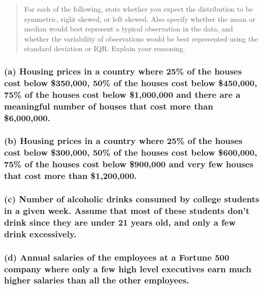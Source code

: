 \documentclass[
]{article}
\begin{document}
\begin{quote}
For each of the following, state whether you expect the distribution to
be symmetric, right skewed, or left skewed. Also specify whether the
mean or median would best represent a typical observation in the data,
and whether the variability of observations would be best represented
using the standard deviation or IQR. Explain your reasoning.
\end{quote}

\subsubsection{(a) Housing prices in a country where 25\% of the houses
cost below \$350,000, 50\% of the houses cost below \$450,000, 75\% of
the houses cost below \$1,000,000 and there are a meaningful number of
houses that cost more than
\$6,000,000.}\label{a-housing-prices-in-a-country-where-25-of-the-houses-cost-below-350000-50-of-the-houses-cost-below-450000-75-of-the-houses-cost-below-1000000-and-there-are-a-meaningful-number-of-houses-that-cost-more-than-6000000.}

\subsubsection{(b) Housing prices in a country where 25\% of the houses
cost below \$300,000, 50\% of the houses cost below \$600,000, 75\% of
the houses cost below \$900,000 and very few houses that cost more than
\$1,200,000.}\label{b-housing-prices-in-a-country-where-25-of-the-houses-cost-below-300000-50-of-the-houses-cost-below-600000-75-of-the-houses-cost-below-900000-and-very-few-houses-that-cost-more-than-1200000.}

\subsubsection{(c) Number of alcoholic drinks consumed by college
students in a given week. Assume that most of these students don't drink
since they are under 21 years old, and only a few drink
excessively.}\label{c-number-of-alcoholic-drinks-consumed-by-college-students-in-a-given-week.-assume-that-most-of-these-students-dont-drink-since-they-are-under-21-years-old-and-only-a-few-drink-excessively.}

\subsubsection{(d) Annual salaries of the employees at a Fortune 500
company where only a few high level executives earn much higher salaries
than all the other
employees.}\label{d-annual-salaries-of-the-employees-at-a-fortune-500-company-where-only-a-few-high-level-executives-earn-much-higher-salaries-than-all-the-other-employees.}
\end{document}
